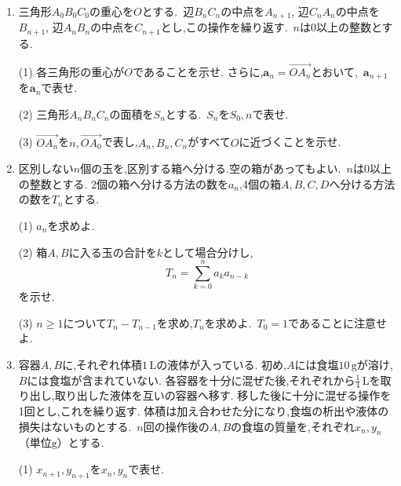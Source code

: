 \begin{enumerate}[label=\textbf{問\arabic*.},leftmargin=3.8em,format=\bookitemlink{practice-bridge}{problem}{hint}]
    \par\smallskip\noindent
    (1) $a_1,a_2,a_3$を求めよ.
    \par\smallskip\noindent
    (2) $a_n$を$3$で割った余りを$r_n$とする.\,
    $r_n=0,1,2$のそれぞれについて$r_{n+1}$を調べ,$a_n$が$3$の倍数になる添字$n$をすべて求めよ.
    \par\smallskip\noindent
    (3) $n\ge1$のとき,$a_n$が整数の平方にならないことを,$4$で割った余りを用いて示せ.
  \item 三角形$A_0B_0C_0$の重心を$O$とする.\,
    辺$B_nC_n$の中点を$A_{n+1}$,
    辺$C_nA_n$の中点を$B_{n+1}$,
    辺$A_nB_n$の中点を$C_{n+1}$とし,この操作を繰り返す.\,
    $n$は$0$以上の整数とする.
    \par\smallskip\noindent
    (1) 各三角形の重心が$O$であることを示せ.
    さらに,$\boldsymbol a_n=\overrightarrow{OA_n}$とおいて,\,
    $\boldsymbol a_{n+1}$を$\boldsymbol a_n$で表せ.
    \par\smallskip\noindent
    (2) 三角形$A_nB_nC_n$の面積を$S_n$とする.\,
    $S_n$を$S_0,n$で表せ.
    \par\smallskip\noindent
    (3) $\overrightarrow{OA_n}$を$n,\overrightarrow{OA_0}$で表し,$A_n,B_n,C_n$がすべて$O$に近づくことを示せ.
  \item 区別しない$n$個の玉を,区別する箱へ分ける.空の箱があってもよい.\,
    $n$は$0$以上の整数とする.
    2個の箱へ分ける方法の数を$a_n$,4個の箱$A,B,C,D$へ分ける方法の数を$T_n$とする.
    \par\smallskip\noindent
    (1) $a_n$を求めよ.
    \par\smallskip\noindent
    (2) 箱$A,B$に入る玉の合計を$k$として場合分けし,
    \[
      T_n=\sum_{k=0}^{n}a_ka_{n-k}
    \]
    を示せ.
    \par\smallskip\noindent
    (3) $n\ge1$について$T_n-T_{n-1}$を求め,$T_n$を求めよ.\,
    $T_0=1$であることに注意せよ.
  \item 容器$A,B$に,それぞれ体積$1\,\mathrm{L}$の液体が入っている.
    初め,$A$には食塩$10\,\mathrm{g}$が溶け,$B$には食塩が含まれていない.
    各容器を十分に混ぜた後,それぞれから$\frac14\,\mathrm{L}$を取り出し,取り出した液体を互いの容器へ移す.
    移した後に十分に混ぜる操作を1回とし,これを繰り返す.
    体積は加え合わせた分になり,食塩の析出や液体の損失はないものとする.\,
    $n$回の操作後の$A,B$の食塩の質量を,それぞれ$x_n,y_n$（単位$\mathrm{g}$）とする.
    \par\smallskip\noindent
    (1) $x_{n+1},y_{n+1}$を$x_n,y_n$で表せ.

\end{enumerate}
